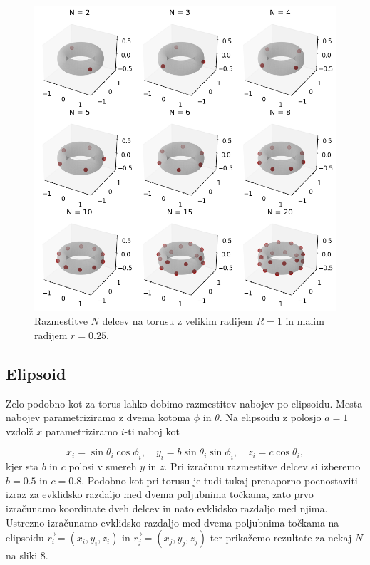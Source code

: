 \documentclass[slovene,11pt,a4paper]{article}
\begin{document}
\newpage

\begin{figure}[h!]
\centering
\includegraphics[width=12.5cm]{torus.png}
\caption{Razmestitve $N$ delcev na torusu z velikim radijem $R=1$ in malim radijem $r=0.25$.}
\end{figure}

\subsection{Elipsoid}

Zelo podobno kot za torus lahko dobimo razmestitev nabojev po elipsoidu. Mesta nabojev parametriziramo z dvema kotoma $\phi$ in $\theta$. Na elipsoidu z polosjo $a=1$ vzdolž $x$ parametriziramo $i$-ti naboj kot

\[
x_i = \sin\theta_i \cos\phi_i, \quad y_i = b\sin\theta_i\sin\phi_i, \quad z_i = c\cos\theta_i,
\]
kjer sta $b$ in $c$ polosi v smereh $y$ in $z$. Pri izračunu razmestitve delcev si izberemo $b=0.5$ in $c=0.8$. Podobno kot pri torusu je tudi tukaj prenaporno  poenostaviti izraz za evklidsko razdaljo med dvema poljubnima točkama, zato prvo izračunamo koordinate dveh delcev in nato evklidsko razdaljo med njima. Ustrezno izračunamo evklidsko razdaljo med dvema poljubnima točkama na elipsoidu $\vec{r_i} = (x_i, y_i, z_i)$ in $\vec{r_j} = (x_j, y_j, z_j)$ ter prikažemo rezultate za nekaj $N$ na sliki 8.
\end{document}

